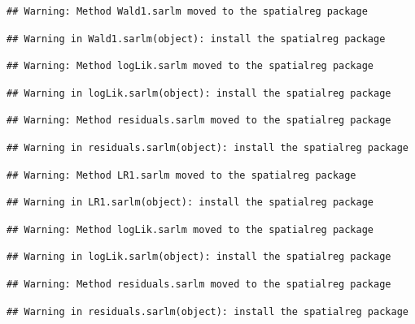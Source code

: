 \documentclass[]{book}
\begin{document}
\begin{verbatim}
## Warning: Method Wald1.sarlm moved to the spatialreg package
\end{verbatim}

\begin{verbatim}
## Warning in Wald1.sarlm(object): install the spatialreg package
\end{verbatim}

\begin{verbatim}
## Warning: Method logLik.sarlm moved to the spatialreg package
\end{verbatim}

\begin{verbatim}
## Warning in logLik.sarlm(object): install the spatialreg package
\end{verbatim}

\begin{verbatim}
## Warning: Method residuals.sarlm moved to the spatialreg package
\end{verbatim}

\begin{verbatim}
## Warning in residuals.sarlm(object): install the spatialreg package
\end{verbatim}

\begin{verbatim}
## Warning: Method LR1.sarlm moved to the spatialreg package
\end{verbatim}

\begin{verbatim}
## Warning in LR1.sarlm(object): install the spatialreg package
\end{verbatim}

\begin{verbatim}
## Warning: Method logLik.sarlm moved to the spatialreg package
\end{verbatim}

\begin{verbatim}
## Warning in logLik.sarlm(object): install the spatialreg package
\end{verbatim}

\begin{verbatim}
## Warning: Method residuals.sarlm moved to the spatialreg package
\end{verbatim}

\begin{verbatim}
## Warning in residuals.sarlm(object): install the spatialreg package
\end{verbatim}
\end{document}
